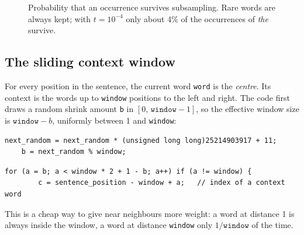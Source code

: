 \documentclass[11pt,a4paper]{article}
\newcommand{\code}[1]{\texttt{#1}}
\begin{document}
\begin{figure}[ht]
\centering
{}
\caption{Probability that an occurrence survives subsampling. Rare words are always
kept; with $t=10^{-4}$ only about 4\% of the occurrences of \emph{the} survive.}
\label{fig:subsample}
\end{figure}

\subsection{The sliding context window}

For every position in the sentence, the current word \code{word} is the
\emph{centre}. Its context is the words up to \code{window} positions to the left and
right. The code first draws a random shrink amount \code{b} in $[0,\,\code{window}-1]$,
so the effective window size is $\code{window}-b$, uniformly between 1 and
\code{window}:

\begin{lstlisting}[firstnumber=448]
    next_random = next_random * (unsigned long long)25214903917 + 11;
    b = next_random % window;
\end{lstlisting}

\begin{lstlisting}[firstnumber=453]
      for (a = b; a < window * 2 + 1 - b; a++) if (a != window) {
        c = sentence_position - window + a;   // index of a context word
\end{lstlisting}

This is a cheap way to give near neighbours more weight: a word at distance 1 is
always inside the window, a word at distance \code{window} only $1/\code{window}$ of
the time.
\end{document}
